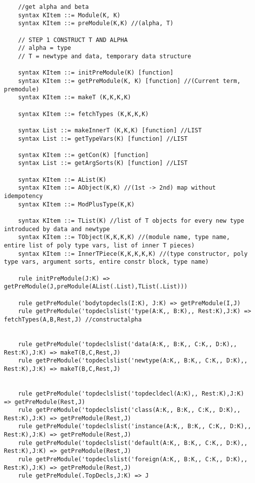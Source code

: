 \begin{lstlisting}
    //get alpha and beta
    syntax KItem ::= Module(K, K)
    syntax KItem ::= preModule(K,K) //(alpha, T)

    // STEP 1 CONSTRUCT T AND ALPHA
    // alpha = type
    // T = newtype and data, temporary data structure

    syntax KItem ::= initPreModule(K) [function]
    syntax KItem ::= getPreModule(K, K) [function] //(Current term, premodule)
    syntax KItem ::= makeT (K,K,K,K)

    syntax KItem ::= fetchTypes (K,K,K,K)

    syntax List ::= makeInnerT (K,K,K) [function] //LIST
    syntax List ::= getTypeVars(K) [function] //LIST

    syntax KItem ::= getCon(K) [function]
    syntax List ::= getArgSorts(K) [function] //LIST

    syntax KItem ::= AList(K)
    syntax KItem ::= AObject(K,K) //(1st -> 2nd) map without idempotency
    syntax KItem ::= ModPlusType(K,K)

    syntax KItem ::= TList(K) //list of T objects for every new type introduced by data and newtype
    syntax KItem ::= TObject(K,K,K,K) //(module name, type name, entire list of poly type vars, list of inner T pieces)
    syntax KItem ::= InnerTPiece(K,K,K,K,K) //(type constructor, poly type vars, argument sorts, entire constr block, type name)

    rule initPreModule(J:K) => getPreModule(J,preModule(AList(.List),TList(.List)))

    rule getPreModule('bodytopdecls(I:K), J:K) => getPreModule(I,J)
    rule getPreModule('topdeclslist('type(A:K,, B:K),, Rest:K),J:K) => fetchTypes(A,B,Rest,J) //constructalpha


    rule getPreModule('topdeclslist('data(A:K,, B:K,, C:K,, D:K),, Rest:K),J:K) => makeT(B,C,Rest,J)
    rule getPreModule('topdeclslist('newtype(A:K,, B:K,, C:K,, D:K),, Rest:K),J:K) => makeT(B,C,Rest,J)


    rule getPreModule('topdeclslist('topdecldecl(A:K),, Rest:K),J:K) => getPreModule(Rest,J)
    rule getPreModule('topdeclslist('class(A:K,, B:K,, C:K,, D:K),, Rest:K),J:K) => getPreModule(Rest,J)
    rule getPreModule('topdeclslist('instance(A:K,, B:K,, C:K,, D:K),, Rest:K),J:K) => getPreModule(Rest,J)
    rule getPreModule('topdeclslist('default(A:K,, B:K,, C:K,, D:K),, Rest:K),J:K) => getPreModule(Rest,J)
    rule getPreModule('topdeclslist('foreign(A:K,, B:K,, C:K,, D:K),, Rest:K),J:K) => getPreModule(Rest,J)
    rule getPreModule(.TopDecls,J:K) => J


\end{lstlisting}
